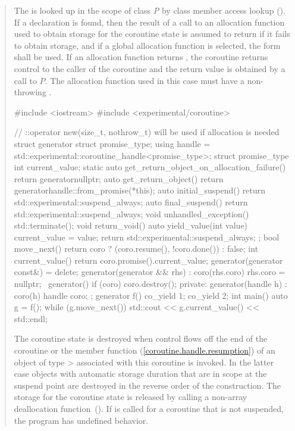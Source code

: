 \begin{quote}
\pnum
The   is looked up in the scope of class \textit{P}
by class member access lookup (). If a declaration is found, then the result of a call to an allocation function used to obtain storage for the coroutine state is assumed to return
 if it fails to obtain storage, and if a global allocation function is selected, the  form shall be used.
If an allocation function returns , the coroutine returns control to the caller of the coroutine and the return value is obtained by a call to $P$. 
The allocation function used in this case must have a non-throwing .

\enterexample
\begin{codeblock}
#include <iostream>
#include <experimental/coroutine>

// ::operator new(size_t, nothrow_t) will be used if allocation is needed
struct generator {
  struct promise_type;
  using handle = std::experimental::coroutine_handle<promise_type>;
  struct promise_type {
    int current_value;
    static auto get_return_object_on_allocation_failure() { return generator{nullptr}; }
    auto get_return_object() { return generator{handle::from_promise(*this)}; }
    auto initial_suspend() { return std::experimental::suspend_always{}; }
    auto final_suspend() { return std::experimental::suspend_always{}; }
    void unhandled_exception() { std::terminate(); }
    void return_void() {}
    auto yield_value(int value) {
      current_value = value;
      return std::experimental::suspend_always{};
    }
  };
  bool move_next() { return coro ? (coro.resume(), !coro.done()) : false; }
  int current_value() { return coro.promise().current_value; }
  generator(generator const&) = delete;
  generator(generator && rhs) : coro(rhs.coro) { rhs.coro = nullptr; }
  ~generator() { if (coro) coro.destroy(); }
private:
  generator(handle h) : coro(h) {}
  handle coro;
};
generator f() { co_yield 1; co_yield 2; }
int main() {
  auto g = f();
  while (g.move_next()) std::cout << g.current_value() << std::endl;
}
\end{codeblock}
\exitexample

\pnum
The coroutine state is destroyed when
control flows off the end of the coroutine or
the  member function (\ref{coroutine.handle.resumption}) of an object of type > associated with this coroutine is invoked. In the latter case objects with automatic storage duration that are in scope
at the suspend point are destroyed in the reverse order of the construction. The storage for the coroutine state is released by calling a non-array deallocation
function~(). If  is called for a coroutine that is not suspended, the program has undefined behavior.


\end{quote}
